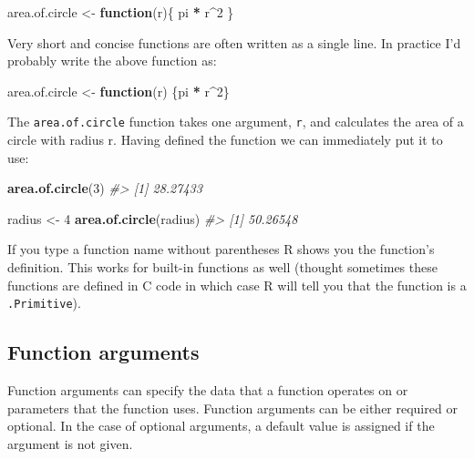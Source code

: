 \documentclass[]{book}
\newenvironment{Shaded}{\begin{snugshade}}{\end{snugshade}}
\newcommand{\CommentTok}[1]{\textcolor[rgb]{0.56,0.35,0.01}{\textit{#1}}}
\newcommand{\ControlFlowTok}[1]{\textcolor[rgb]{0.13,0.29,0.53}{\textbf{#1}}}
\newcommand{\DecValTok}[1]{\textcolor[rgb]{0.00,0.00,0.81}{#1}}
\newcommand{\KeywordTok}[1]{\textcolor[rgb]{0.13,0.29,0.53}{\textbf{#1}}}
\newcommand{\NormalTok}[1]{#1}
\newcommand{\OperatorTok}[1]{\textcolor[rgb]{0.81,0.36,0.00}{\textbf{#1}}}
\newcommand{\StringTok}[1]{\textcolor[rgb]{0.31,0.60,0.02}{#1}}
\theoremstyle{definition}
\theoremstyle{definition}
\theoremstyle{definition}
\theoremstyle{remark}
\begin{document}
\begin{Shaded}
\begin{Highlighting}[]
\NormalTok{area.of.circle <-}\StringTok{ }\ControlFlowTok{function}\NormalTok{(r)\{}
\NormalTok{  pi }\OperatorTok{*}\StringTok{ }\NormalTok{r}\OperatorTok{^}\DecValTok{2}
\NormalTok{\}}
\end{Highlighting}
\end{Shaded}

Very short and concise functions are often written as a single line. In
practice I'd probably write the above function as:

\begin{Shaded}
\begin{Highlighting}[]
\NormalTok{area.of.circle <-}\StringTok{ }\ControlFlowTok{function}\NormalTok{(r) \{pi }\OperatorTok{*}\StringTok{ }\NormalTok{r}\OperatorTok{^}\DecValTok{2}\NormalTok{\}}
\end{Highlighting}
\end{Shaded}

The \texttt{area.of.circle} function takes one argument, \texttt{r}, and
calculates the area of a circle with radius r. Having defined the
function we can immediately put it to use:

\begin{Shaded}
\begin{Highlighting}[]
\KeywordTok{area.of.circle}\NormalTok{(}\DecValTok{3}\NormalTok{)}
\CommentTok{#> [1] 28.27433}

\NormalTok{radius <-}\StringTok{ }\DecValTok{4}
\KeywordTok{area.of.circle}\NormalTok{(radius)}
\CommentTok{#> [1] 50.26548}
\end{Highlighting}
\end{Shaded}

If you type a function name without parentheses R shows you the
function's definition. This works for built-in functions as well
(thought sometimes these functions are defined in C code in which case R
will tell you that the function is a \texttt{.Primitive}).

\hypertarget{function-arguments}{%
\subsection{Function arguments}\label{function-arguments}}

Function arguments can specify the data that a function operates on or
parameters that the function uses. Function arguments can be either
required or optional. In the case of optional arguments, a default value
is assigned if the argument is not given.
\end{document}
